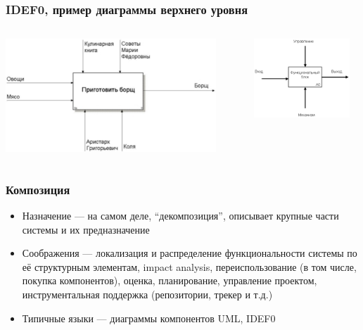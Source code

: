 \documentclass[xetex,mathserif,serif]{beamer}
\begin{document}
	\begin{frame}
		\frametitle{IDEF0, пример диаграммы верхнего уровня}
		\begin{columns}
			\begin{column}{0.65\textwidth}
				\begin{center}
					\includegraphics[width=0.9\textwidth]{idef0Example.png}
				\end{center}
			\end{column}
			\begin{column}{0.35\textwidth}
				\vspace{3.5cm}
				\begin{center}
					\includegraphics[width=0.9\textwidth]{idef0Syntax.png}
				\end{center}
			\end{column}
		\end{columns}
	\end{frame}

	\begin{frame}
		\frametitle{Композиция}
		\begin{itemize}
			\item Назначение --- на самом деле, ``декомпозиция'', описывает крупные части системы и их предназначение
			\item Соображения --- локализация и распределение функциональности системы по её структурным элементам, impact analysis, переиспользование (в том числе, покупка компонентов), оценка, планирование, управление проектом, инструментальная поддержка (репозитории, трекер и т.д.)
			\item Типичные языки --- диаграммы компонентов UML, IDEF0
		\end{itemize}
	\end{frame}
\end{document}

